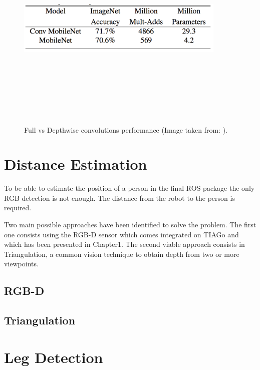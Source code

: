 \begin{figure}[!htbp]
\begin{center}
\includegraphics[width=10cm,height=10cm,keepaspectratio]{images/mobileNet_table.png}
\end{center}
\caption{Full vs Depthwise convolutions performance (Image taken from: \cite{paper:MobileNets}).}
\end{figure}

\section{Distance Estimation}

To be able to estimate the position of a person in the final ROS package the only RGB detection is not enough. The distance from the robot to the person is required.

Two main possible approaches have been identified to solve the problem. The first one consists using the RGB-D sensor which comes integrated on TIAGo and which has been presented in Chapter1. The second viable approach consists in Triangulation, a common vision technique to obtain depth from two or more viewpoints.

\subsection{RGB-D}



\subsection{Triangulation}

\section{Leg Detection}